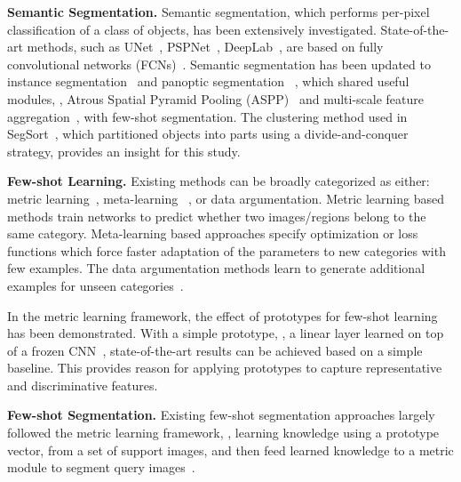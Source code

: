 \documentclass[runningheads]{llncs}
\begin{document}
\textbf{Semantic Segmentation.}
Semantic segmentation, which performs per-pixel classification of a class of objects, has been extensively investigated. State-of-the-art methods, such as UNet~\cite{UNet}, PSPNet~\cite{PSPNet}, DeepLab~\cite{DeepLabV1,DeepLabV2,DeepLabV3}, are based on fully convolutional networks (FCNs)~\cite{FCN}. Semantic segmentation has been updated to instance segmentation~\cite{MaskRCNN-PAMI2020} and panoptic segmentation ~\cite{PanopticFPN-CVPR2019}, which shared useful modules, , Atrous Spatial Pyramid Pooling (ASPP)~\cite{DeepLabV2} and multi-scale feature aggregation~\cite{PSPNet}, with few-shot segmentation. The clustering method used in SegSort~\cite{SegSort}, which partitioned objects into parts using a divide-and-conquer strategy, provides an insight for this study.

\textbf{Few-shot Learning.}
Existing methods can be broadly categorized as either: metric learning~\cite{MatchNetwork16,Compare2018,CollectSelect19}, meta-learning ~\cite{LearningToLearn16,Optimization17,MAML17,TaskAgnosticMeta19}, or data argumentation.
Metric learning based methods train networks to predict whether two images/regions belong to the same category. Meta-learning based approaches specify optimization or loss functions which force faster adaptation of the parameters to new categories with few examples. The data argumentation methods learn to generate additional examples for unseen categories~\cite{Hallucinating17,Imaginary18}. 

In the metric learning framework, the effect of prototypes for few-shot learning has been demonstrated. With a simple prototype, , a linear layer learned on top of a frozen CNN~\cite{CloserLook19}, state-of-the-art results can be achieved based on a simple baseline. This provides reason for applying prototypes to capture representative and discriminative features.

\textbf{Few-shot Segmentation. }
Existing few-shot segmentation approaches largely followed the metric learning framework, , learning knowledge using a prototype vector, from a set of support images, and then feed learned knowledge to a metric module to segment query images~\cite{PANet}.
\end{document}
